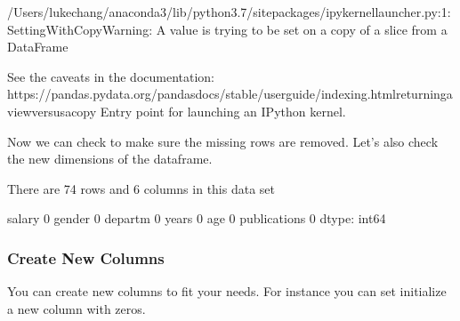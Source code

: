 \documentclass[letterpaper,10pt,english]{sphinxmanual}
\begin{document}
\begin{sphinxVerbatim}[commandchars=\\\{\}]
/Users/lukechang/anaconda3/lib/python3.7/site\PYGZhy{}packages/ipykernel\PYGZus{}launcher.py:1: SettingWithCopyWarning: 
A value is trying to be set on a copy of a slice from a DataFrame

See the caveats in the documentation: https://pandas.pydata.org/pandas\PYGZhy{}docs/stable/user\PYGZus{}guide/indexing.html\PYGZsh{}returning\PYGZhy{}a\PYGZhy{}view\PYGZhy{}versus\PYGZhy{}a\PYGZhy{}copy
  \PYGZdq{}\PYGZdq{}\PYGZdq{}Entry point for launching an IPython kernel.
\end{sphinxVerbatim}

Now we can check to make sure the missing rows are removed.  Let’s also check the new dimensions of the dataframe.

\begin{sphinxVerbatim}[commandchars=\\\{\}]
   

\end{sphinxVerbatim}

\begin{sphinxVerbatim}[commandchars=\\\{\}]
There are 74 rows and 6 columns in this data set
\end{sphinxVerbatim}

\begin{sphinxVerbatim}[commandchars=\\\{\}]
salary          0
gender          0
departm         0
years           0
age             0
publications    0
dtype: int64
\end{sphinxVerbatim}


\subsubsection{Create New Columns}
\label{\detokenize{content/Introduction_to_Pandas:create-new-columns}}
You can create new columns to fit your needs.
For instance you can set initialize a new column with zeros.
\end{document}
